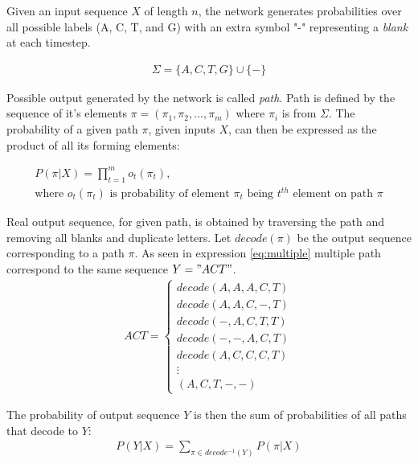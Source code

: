 \documentclass[times, utf8, diplomski, numeric, english]{fer}
\begin{document}
Given an input sequence $X$ of length $n$, the network generates probabilities over all possible labels (A, C, T, and G) with an extra symbol "-" representing a \textit{blank} at each timestep. 

\begin{equation}
\begin{gathered}
\Sigma = \{A, C, T, G\} \cup \{-\}
\end{gathered}
\end{equation}


Possible output generated by the network is called \textit{path}. Path is defined by the sequence of it's elements $\pi = (\pi_1, \pi_2, ..., \pi_m)$ where $\pi_i$ is from $\Sigma$.
The probability of a given path $\pi$, given inputs $X$, can then be expressed as the product of all its forming elements:

\begin{equation}
\begin{gathered}
P(\pi | X) = \prod_{t=1}^{m} o_t(\pi_t), \\
\text{where $o_t(\pi_t)$ is probability of element $\pi_t$ being $t^{th}$ element on path $\pi$}
\end{gathered}
\end{equation}


Real output sequence, for given path, is obtained by traversing the path and removing all blanks and duplicate letters. Let $ decode(\pi) $ be the output sequence corresponding to a path $\pi$. As seen
in expression \ref{eq:multiple} multiple path correspond to the same sequence $Y="ACT"$.
\begin{equation}
\begin{gathered}
\label{eq:multiple}
ACT = \begin{cases}
decode(A, A, A, C, T) \\
decode(A, A, C, -, T) \\
decode(-, A, C, T, T)  \\
decode(-, -, A, C, T)  \\
decode(A, C, C, C, T)  \\
\vdots \\
(A, C, T, -, -) 
\end{cases}
\end{gathered}
\end{equation}

The probability of output sequence $Y$ is then the sum of probabilities of all paths that decode to $Y$:
\begin{equation}
\begin{gathered}
P(Y | X) = \sum_{\pi \in decode^{-1}(Y)}^{} P(\pi | X)
\end{gathered}
\end{equation}
\end{document}
